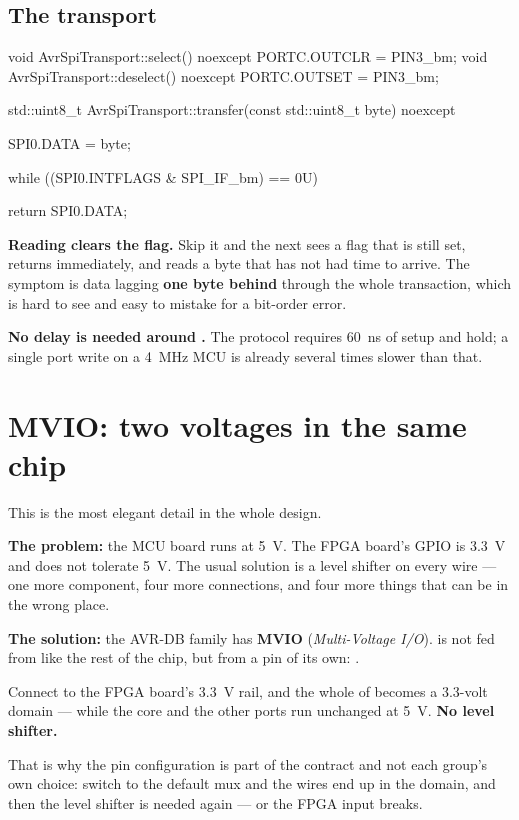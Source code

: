 \subsection{The transport}

\begin{cppcode}
void AvrSpiTransport::select() noexcept   { PORTC.OUTCLR = PIN3_bm; }
void AvrSpiTransport::deselect() noexcept { PORTC.OUTSET = PIN3_bm; }

std::uint8_t AvrSpiTransport::transfer(const std::uint8_t byte) noexcept
{
    SPI0.DATA = byte;

    while ((SPI0.INTFLAGS & SPI_IF_bm) == 0U)
    {
    }

    return SPI0.DATA;
}
\end{cppcode}

\textbf{Reading  clears the flag.} Skip it and the next  sees a
flag that is still set, returns immediately, and reads a byte that has not had time to arrive. The
symptom is data lagging \textbf{one byte behind} through the whole transaction, which is hard to
see and easy to mistake for a bit-order error.

\textbf{No delay is needed around .} The protocol requires 60~ns of setup and hold; a
single port write on a 4~MHz MCU is already several times slower than that.

\section{MVIO: two voltages in the same chip}
\label{sec:mvio}

This is the most elegant detail in the whole design.

\textbf{The problem:} the MCU board runs at 5~V. The FPGA board's GPIO is 3.3~V and does not
tolerate 5~V. The usual solution is a level shifter on every wire --- one more component, four more
connections, and four more things that can be in the wrong place.

\textbf{The solution:} the AVR-DB family has \textbf{MVIO} (\emph{Multi-Voltage I/O}).
 is not fed from  like the rest of the chip, but from a pin of its own:
.

Connect  to the FPGA board's 3.3~V rail, and the whole of  becomes a
3.3-volt domain --- while the core and the other ports run unchanged at 5~V. \textbf{No level
shifter.}

That is why the pin configuration is part of the contract and not each group's own choice: switch
to the default mux and the wires end up in the  domain, and then the level shifter is
needed again --- or the FPGA input breaks.

